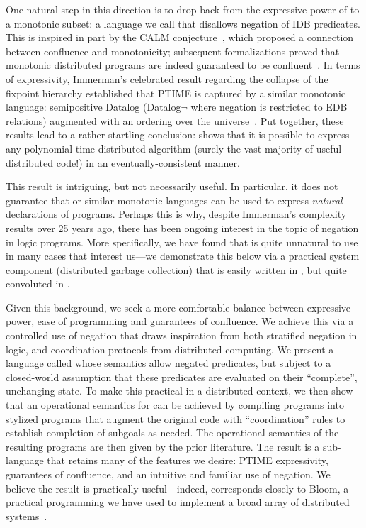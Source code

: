 One natural step in this direction is to drop back from the expressive power of \lang to a monotonic subset: a language we call \slang that disallows negation of IDB predicates.  This is inspired in part by the CALM conjecture~\cite{cidr11, declarative-imperative}, which proposed a connection between confluence
and monotonicity; subsequent formalizations proved that monotonic distributed programs are indeed guaranteed to be confluent~\cite{relational-transducers, Abiteboul2011}.  
In terms of expressivity, Immerman's celebrated result regarding the collapse of the fixpoint hierarchy established that PTIME is captured by a similar monotonic language: semipositive Datalog (Datalog$\lnot$ where negation is restricted to EDB relations) augmented with an ordering over the universe~\cite{immerman-ptime}.  Put together, these results lead to a rather startling conclusion: \slang shows that it is possible to express any polynomial-time distributed algorithm (surely the vast majority of useful distributed code!) in an eventually-consistent manner.

This result is intriguing, but not necessarily useful.  In particular, it does not guarantee that \slang or similar monotonic languages can be used to express {\em natural} declarations of programs. Perhaps this is why, despite Immerman's complexity results over 25 years ago, there has been ongoing interest in the topic of negation in logic programs.  More specifically, we have found that \slang is quite unnatural to use in many cases that interest us---we demonstrate this below via a practical system component (distributed garbage collection) that is easily written in \lang, but quite convoluted in \slang.

Given this background, we seek a more comfortable balance between expressive power, ease of programming and guarantees of confluence.  We achieve this via a controlled use of negation that draws inspiration from both stratified negation in logic, and coordination protocols from distributed computing.  We present a language called \plang whose semantics allow negated predicates, but subject to a closed-world assumption that these predicates are evaluated on their ``complete'', unchanging state.  To make this practical in a distributed context, we then show that an operational semantics for \plang can be achieved by compiling \plang programs into stylized \lang programs that augment the original code with ``coordination'' rules to establish completion of subgoals as needed. The operational semantics of the resulting \lang programs are then given by the prior literature.  The result is a sub-language that retains many of the features we desire: PTIME expressivity, guarantees of confluence, and an intuitive and familiar use of negation.  We believe the result is practically useful---indeed, \plang corresponds closely to Bloom, a practical programming we have used to implement a broad array of distributed systems~\cite{bloom}.

